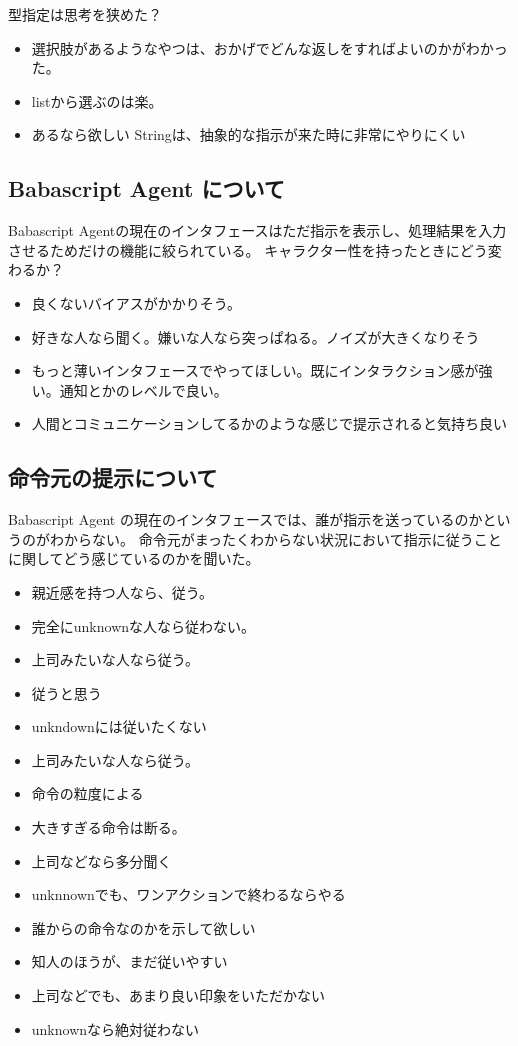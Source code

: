 型指定は思考を狭めた？

\begin{itemize}
\item
  選択肢があるようなやつは、おかげでどんな返しをすればよいのかがわかった。
\item
  listから選ぶのは楽。
\item
  あるなら欲しい Stringは、抽象的な指示が来た時に非常にやりにくい
\end{itemize}

\subsection{Babascript Agent
について}\label{babascript-agent-ux306bux3064ux3044ux3066}

Babascript
Agentの現在のインタフェースはただ指示を表示し、処理結果を入力させるためだけの機能に絞られている。
キャラクター性を持ったときにどう変わるか？

\begin{itemize}
\item
  良くないバイアスがかかりそう。
\item
  好きな人なら聞く。嫌いな人なら突っぱねる。ノイズが大きくなりそう
\item
  もっと薄いインタフェースでやってほしい。既にインタラクション感が強い。通知とかのレベルで良い。
\item
  人間とコミュニケーションしてるかのような感じで提示されると気持ち良い
\end{itemize}

\subsection{命令元の提示について}\label{ux547dux4ee4ux5143ux306eux63d0ux793aux306bux3064ux3044ux3066}

Babascript Agent
の現在のインタフェースでは、誰が指示を送っているのかというのがわからない。
命令元がまったくわからない状況において指示に従うことに関してどう感じているのかを聞いた。

\begin{itemize}
\itemsep1pt\parskip0pt
\item
  親近感を持つ人なら、従う。
\item
  完全にunknownな人なら従わない。
\item
  上司みたいな人なら従う。
\item
  従うと思う
\item
  unkndownには従いたくない
\item
  上司みたいな人なら従う。
\item
  命令の粒度による
\item
  大きすぎる命令は断る。
\item
  上司などなら多分聞く
\item
  unknnownでも、ワンアクションで終わるならやる
\item
  誰からの命令なのかを示して欲しい
\item
  知人のほうが、まだ従いやすい
\item
  上司などでも、あまり良い印象をいただかない
\item
  unknownなら絶対従わない
\end{itemize}

